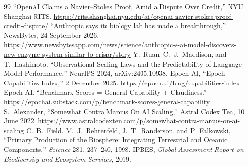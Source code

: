 \documentclass[11pt]{article}
\begin{document}
\begin{thebibliography}{99}
 ``OpenAI Claims a Navier--Stokes Proof, Amid a Dispute Over Credit,'' NYU Shanghai RITS. \url{https://rits.shanghai.nyu.edu/ai/openai-navier-stokes-proof-credit-dispute/}
 ``Anthropic says its biology lab has made a breakthrough,'' NewsBytes, 24 September 2026. \url{https://www.newsbytesapp.com/news/science/anthropic-s-ai-model-discovers-new-enzyme-system-similar-to-crispr/story}
 Y.\ Ruan, C.\ J.\ Maddison, and T.\ Hashimoto, ``Observational Scaling Laws and the Predictability of Language Model Performance,'' NeurIPS 2024, arXiv:2405.10938.
 Epoch AI, ``Epoch Capabilities Index,'' 2 December 2025. \url{https://epoch.ai/blog/capabilities-index}
 Epoch AI, ``Benchmark Scores = General Capability + Claudiness.'' \url{https://epochai.substack.com/p/benchmark-scores-general-capability}
 S.\ Alexander, ``Somewhat Contra Marcus On AI Scaling,'' Astral Codex Ten, 10 June 2022. \url{https://www.astralcodexten.com/p/somewhat-contra-marcus-on-ai-scaling}
 C.\ B.\ Field, M.\ J.\ Behrenfeld, J.\ T.\ Randerson, and P.\ Falkowski, ``Primary Production of the Biosphere: Integrating Terrestrial and Oceanic Components,'' \emph{Science} 281, 237--240, 1998.
 IPBES, \emph{Global Assessment Report on Biodiversity and Ecosystem Services}, 2019.
\end{thebibliography}
\end{document}
